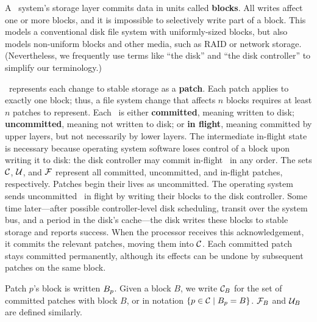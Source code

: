 A \Kudos\ system's storage layer commits data in units called
 \textbf{blocks}.
%
All writes affect one or more blocks, and it is impossible to selectively
 write part of a block.
%
This models a conventional disk file system with uniformly-sized blocks,
 but also models non-uniform blocks and other media, such as RAID or
 network storage.
%
(Nevertheless, we frequently use terms like ``the disk'' and ``the disk
 controller'' to simplify our terminology.)

\Kudos\ represents each change to stable storage as a \textbf{patch}.
%
Each patch applies to exactly one block; thus, a file system change that
 affects $n$ blocks requires at least $n$ patches to represent.
%
Each \patch\ is either
 \textbf{committed}, meaning written to disk;
 \textbf{uncommitted}, meaning not written to disk;
 or \textbf{in flight}, meaning committed by upper layers, but not
 necessarily by lower layers.
%
The intermediate in-flight state is necessary because
 operating system software loses control of a block upon writing it
 to disk: the disk controller may commit in-flight \patches\ in any order.
%
The sets $\PDisk$, $\PMem$, and $\PInf$ represent all committed,
 uncommitted, and in-flight patches, respectively.
%
Patches begin their lives as uncommitted.
%
The operating system sends uncommitted \patches\ in flight
 by writing their blocks to the disk controller.  Some
 time later---after possible controller-level disk scheduling, transit over
 the system bus, and a period in the disk's cache---the disk writes these blocks
 to stable storage and reports success.  When the processor receives this
 acknowledgement, it commits the relevant patches, moving them into $\PDisk$.
%
Each committed patch stays committed permanently, although its effects can
 be undone by subsequent patches on the same block.
%
%

Patch $p$'s block is written $B_{p}$.
%
Given a block $B$, we write $\PDisk[B]$ for the set of committed
 patches with block $B$, or in notation $\{p\in\PDisk\mid\PBlock{p}=B\}$.
%
$\PInf[B]$ and $\PMem[B]$ are defined similarly.


